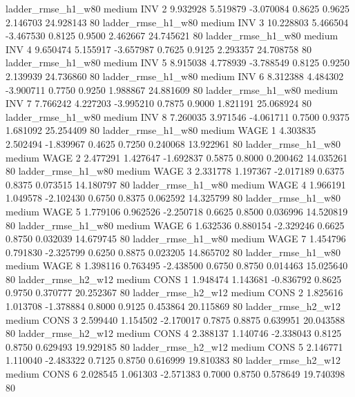     ladder_rmse_h1_w80     medium      INV                 2  9.932928 5.519879 -3.070084 0.8625 0.9625  2.146703   24.928143 80
    ladder_rmse_h1_w80     medium      INV                 3 10.228803 5.466504 -3.467530 0.8125 0.9500  2.462667   24.745621 80
    ladder_rmse_h1_w80     medium      INV                 4  9.650474 5.155917 -3.657987 0.7625 0.9125  2.293357   24.708758 80
    ladder_rmse_h1_w80     medium      INV                 5  8.915038 4.778939 -3.788549 0.8125 0.9250  2.139939   24.736860 80
    ladder_rmse_h1_w80     medium      INV                 6  8.312388 4.484302 -3.900711 0.7750 0.9250  1.988867   24.881609 80
    ladder_rmse_h1_w80     medium      INV                 7  7.766242 4.227203 -3.995210 0.7875 0.9000  1.821191   25.068924 80
    ladder_rmse_h1_w80     medium      INV                 8  7.260035 3.971546 -4.061711 0.7500 0.9375  1.681092   25.254409 80
    ladder_rmse_h1_w80     medium     WAGE                 1  4.303835 2.502494 -1.839967 0.4625 0.7250  0.240068   13.922961 80
    ladder_rmse_h1_w80     medium     WAGE                 2  2.477291 1.427647 -1.692837 0.5875 0.8000  0.200462   14.035261 80
    ladder_rmse_h1_w80     medium     WAGE                 3  2.331778 1.197367 -2.017189 0.6375 0.8375  0.073515   14.180797 80
    ladder_rmse_h1_w80     medium     WAGE                 4  1.966191 1.049578 -2.102430 0.6750 0.8375  0.062592   14.325799 80
    ladder_rmse_h1_w80     medium     WAGE                 5  1.779106 0.962526 -2.250718 0.6625 0.8500  0.036996   14.520819 80
    ladder_rmse_h1_w80     medium     WAGE                 6  1.632536 0.880154 -2.329246 0.6625 0.8750  0.032039   14.679745 80
    ladder_rmse_h1_w80     medium     WAGE                 7  1.454796 0.791830 -2.325799 0.6250 0.8875  0.023205   14.865702 80
    ladder_rmse_h1_w80     medium     WAGE                 8  1.398116 0.763495 -2.438500 0.6750 0.8750  0.014463   15.025640 80
    ladder_rmse_h2_w12     medium     CONS                 1  1.948474 1.143681 -0.836792 0.8625 0.9750  0.370777   20.252367 80
    ladder_rmse_h2_w12     medium     CONS                 2  1.825616 1.013708 -1.378884 0.8000 0.9125  0.453864   20.115869 80
    ladder_rmse_h2_w12     medium     CONS                 3  2.599440 1.154502 -2.170017 0.7875 0.8875  0.639951   20.043588 80
    ladder_rmse_h2_w12     medium     CONS                 4  2.388137 1.140746 -2.338043 0.8125 0.8750  0.629493   19.929185 80
    ladder_rmse_h2_w12     medium     CONS                 5  2.146771 1.110040 -2.483322 0.7125 0.8750  0.616999   19.810383 80
    ladder_rmse_h2_w12     medium     CONS                 6  2.028545 1.061303 -2.571383 0.7000 0.8750  0.578649   19.740398 80
